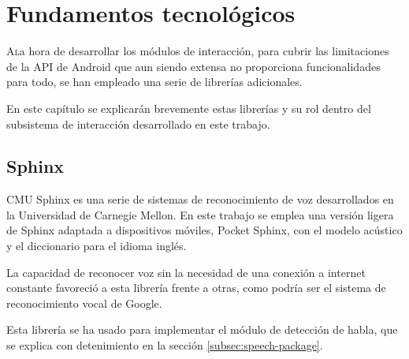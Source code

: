 \chapter{Fundamentos tecnológicos}
\label{chap:fundamentos-tecnologicos}

\lettrine{A} la hora de desarrollar los módulos de  interacción, para cubrir las limitaciones de la API de Android que aun siendo extensa no proporciona funcionalidades para todo, se han empleado una serie de librerías adicionales. 

En este capítulo se explicarán brevemente estas librerías y su rol dentro del subsistema de interacción desarrollado en este trabajo.
 \section{Sphinx}
 \label{subsec:sphinx}

 
 CMU Sphinx\cite{cmusphinx} es una serie de sistemas de reconocimiento de voz desarrollados en la Universidad de Carnegie Mellon.
 En este trabajo se emplea una versión ligera de Sphinx adaptada a dispositivos móviles, Pocket Sphinx, con el modelo acústico y el diccionario para el idioma inglés.
 
 La capacidad de reconocer voz sin la necesidad de una conexión a internet constante favoreció a esta librería frente a otras, como podría ser el sistema de reconocimiento vocal de Google.
 
 Esta librería se ha usado para implementar el módulo de detección de habla, que se explica con detenimiento en la sección \ref{subsec:speech-package}.



